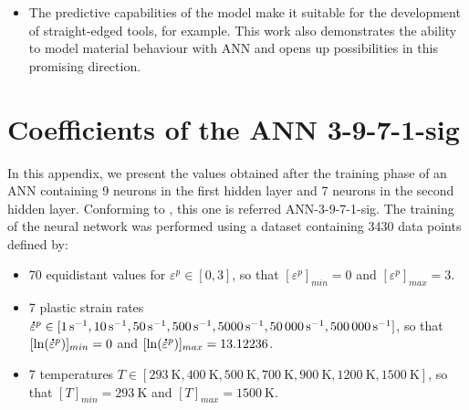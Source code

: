 \documentclass[preprint,12pt,times]{elsarticle}
\newcommand{\mdot}[1]{\accentset{\mbox{\bfseries .}}{#1}} %
\begin{document}
\begin{itemize}
  \item The predictive capabilities of the model make it suitable for the development of straight-edged tools, for example. This work also demonstrates the ability to model material behaviour with ANN and opens up possibilities in this promising direction.
\end{itemize}

%
%


%
%
%
%


%
%
%

\appendix
%
\section{Coefficients of the ANN 3-9-7-1-sig\label{sec:appendix-1}}

In this appendix, we present the values obtained after the training phase of an ANN containing 9 neurons in the first hidden layer and 7 neurons in the second hidden layer. Conforming to \cite{pantale_Efficient_2022}, this one is referred ANN-3-9-7-1-sig.
The training of the neural network was performed using a dataset containing \num{3430} data points defined by:
\begin{itemize}
\item \num{70} equidistant values for $\varepsilon^p\in[0,3]$, so that $[\varepsilon^p]_{min}=0$ and $[\varepsilon^p]_{max}=3$.
\item \num{7} plastic strain rates $\mdot{\varepsilon}^p\in[\qty{1}{\per\s}, \qty{10}{\per\s}, \qty{50}{\per\s}, \qty{500}{\per\s}, \qty{5000}{\per\s}, \qty{50000}{\per\s}, \qty{500000}{\per\s}]$, so that $[\ln(\mdot{\varepsilon}^p)]_{min}=0$ and $[\ln(\mdot{\varepsilon}^p)]_{max}=13.12236$.
\item \num{7} temperatures $T\in[\qty{293}{\K}, \qty{400}{\K}, \qty{500}{\K}, \qty{700}{\K}, \qty{900}{\K}, \qty{1200}{\K}, \qty{1500}{\K}]$, so that $[T]_{min}=\qty{293}{\K}$ and $[T]_{max}=\qty{1500}{\K}$.
\end{itemize}
\end{document}
